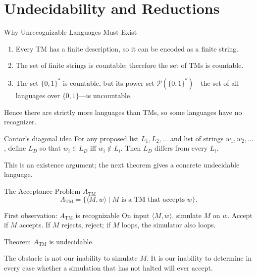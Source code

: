 \documentclass[10pt]{beamer}
\newcommand{\ATM}{A_{\mathrm{TM}}}
\begin{document}
\section{Undecidability and Reductions}

\begin{frame}{Why Unrecognizable Languages Must Exist}
  \begin{enumerate}
    \item Every TM has a finite description, so it can be encoded as a finite string.
    \item The set of finite strings is countable; therefore the set of TMs is countable.
    \item The set $\{0,1\}^*$ is countable, but its power set
      $\mathcal{P}(\{0,1\}^*)$---the set of all languages over $\{0,1\}$---is uncountable.
  \end{enumerate}
  Hence there are strictly more languages than TMs, so some languages have no recognizer.
  \begin{block}{Cantor's diagonal idea}
    For any proposed list $L_1,L_2,\ldots$ and list of strings $w_1,w_2,\ldots$, define
    $L_D$ so that $w_i\in L_D$ iff $w_i\notin L_i$. Then $L_D$ differs from every $L_i$.
  \end{block}
  This is an existence argument; the next theorem gives a concrete undecidable language.
\end{frame}

\begin{frame}{The Acceptance Problem $\ATM$}
  \[
    \ATM=\{\langle M,w\rangle\mid M\text{ is a TM that accepts }w\}.
  \]
  \begin{block}{First observation: $\ATM$ is recognizable}
    On input $\langle M,w\rangle$, simulate $M$ on $w$. Accept if $M$ accepts.
    If $M$ rejects, reject; if $M$ loops, the simulator also loops.
  \end{block}
  \begin{alertblock}{Theorem}
    $\ATM$ is undecidable.
  \end{alertblock}
  The obstacle is not our inability to simulate $M$. It is our inability to determine in every case
  whether a simulation that has not halted will ever accept.
\end{frame}
\end{document}

